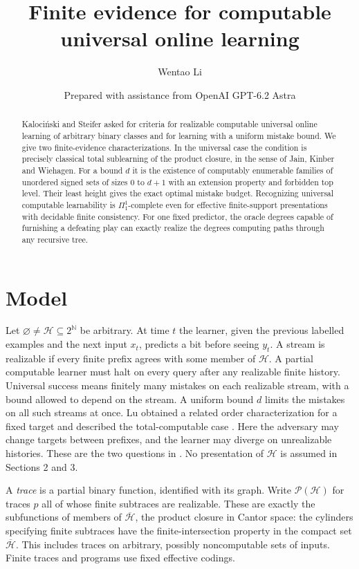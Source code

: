 \documentclass[11pt]{article}
\title{Finite evidence for computable universal online learning}
\author{Wentao Li}
\date{\small Prepared with assistance from OpenAI GPT-6.2 Astra}
\newcommand{\N}{\mathbb N}
\newcommand{\cl}{\overline{\mathcal H}}
\newcommand{\HH}{\mathcal H}
\begin{document}
\maketitle
\begin{abstract}
Kaloci\'nski and Steifer asked for criteria for realizable computable universal online learning of arbitrary binary classes and for learning with a uniform mistake bound. We give two finite-evidence characterizations. In the universal case the condition is precisely classical total sublearning of the product closure, in the sense of Jain, Kinber and Wiehagen. For a bound $d$ it is the existence of computably enumerable families of unordered signed sets of sizes $0$ to $d+1$ with an extension property and forbidden top level. Their least height gives the exact optimal mistake budget. Recognizing universal computable learnability is $\Pi^1_1$-complete even for effective finite-support presentations with decidable finite consistency. For one fixed predictor, the oracle degrees capable of furnishing a defeating play can exactly realize the degrees computing paths through any recursive tree.
\end{abstract}

\section{Model}
Let $\varnothing\ne\HH\subseteq 2^\N$ be arbitrary. At time $t$ the learner, given the previous labelled examples and the next input $x_t$, predicts a bit before seeing $y_t$. A stream is realizable if every finite prefix agrees with some member of $\HH$. A partial computable learner must halt on every query after any realizable finite history. Universal success means finitely many mistakes on each realizable stream, with a bound allowed to depend on the stream. A uniform bound $d$ limits the mistakes on all such streams at once. Lu obtained a related order characterization for a fixed target and described the total-computable case \cite{lu}. Here the adversary may change targets between prefixes, and the learner may diverge on unrealizable histories. These are the two questions in \cite[\S3]{ks}. No presentation of $\HH$ is assumed in Sections 2 and 3.

A \emph{trace} is a partial binary function, identified with its graph. Write $\mathcal P(\HH)$ for traces $p$ all of whose finite subtraces are realizable. These are exactly the subfunctions of members of $\cl$, the product closure in Cantor space: the cylinders specifying finite subtraces have the finite-intersection property in the compact set $\cl$. This includes traces on arbitrary, possibly noncomputable sets of inputs. Finite traces and programs use fixed effective codings.
\end{document}
